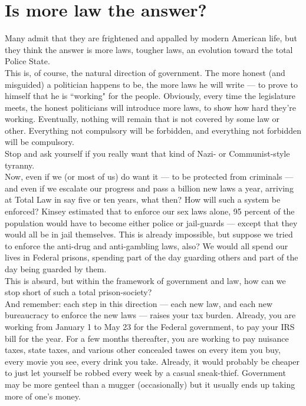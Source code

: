 \section*{Is more law the answer?}

Many admit that they are frightened and appalled by modern American life, but they think the answer is more laws, tougher laws, an evolution toward the total Police State.\\
This is, of course, the natural direction of government. The more honest (and misguided) a politician happens to be, the more laws he will write --- to prove to himself that he is ``working" for the people. Obviously, every time the legislature meets, the honest politicians will introduce more laws, to show how hard they're working. Eventually, nothing will remain that is not covered by some law or other. Everything not compulsory will be forbidden, and everything not forbidden will be compulsory.\\
Stop and ask yourself if you really want that kind of Nazi- or Communist-style tyranny.\\
Now, even if we (or most of us) do want it --- to be protected from criminals --- and even if we escalate our progress and pass a billion new laws a year, arriving at Total Law in say five or ten years, what then? How will such a system be enforced? Kinsey estimated that to enforce our sex laws alone, 95 percent of the population would have to become either police or jail-guards --- except that they would all be in jail themselves. This is already impossible, but suppose we tried to enforce the anti-drug and anti-gambling laws, also? We would all spend our lives in Federal prisons, spending part of the day guarding others and part of the day being guarded by them.\\
This is absurd, but within the framework of government and law, how can we stop short of such a total prison-society?\\
And remember: each step in this direction --- each new law, and each new bureaucracy to enforce the new laws --- raises your tax burden. Already, you are working from January 1 to May 23 for the Federal government, to pay your IRS bill for the year. For a few months thereafter, you are working to pay nuisance taxes, state taxes, and various other concealed tawes on every item you buy, every movie you see, every drink you take. Already, it would probably be cheaper to just let yourself be robbed every week by a casual sneak-thief. Government may be more genteel than a mugger (occasionally) but it usually ends up taking more of one's money.

